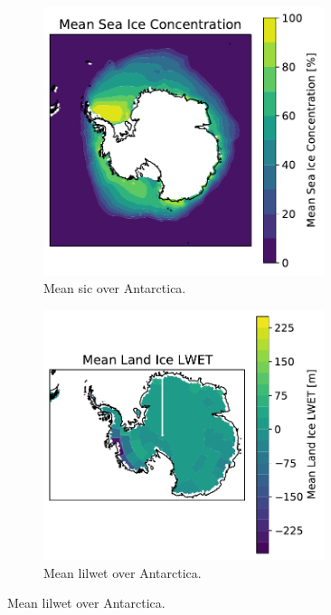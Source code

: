 \documentclass[../main.tex]{subfiles}
\begin{document}
\begin{figure}[ht!]
\centering
\begin{subfigure}[ht!]{0.49\textwidth}
\includegraphics[width=0.9\textwidth]{images/week8/hres/mean_sic_distribution}
\caption{Mean \gls{sic} over Antarctica.}
\end{subfigure}
\begin{subfigure}[ht!]{0.49\textwidth}
\includegraphics[width=0.9\textwidth]{images/week8/hres/mean_lic_distribution}
\caption{Mean \gls{lilwet} over Antarctica.}
\end{subfigure}

\end{figure}
\end{document}
